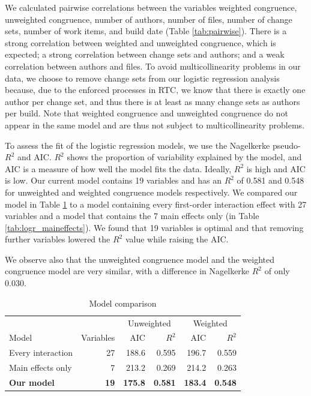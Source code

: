 \documentclass[12pt,oneside]{book}
\begin{document}
We calculated pairwise correlations between the variables weighted congruence, unweighted congruence, number of authors, number of files, number of change sets, number of work items, and build date (Table \ref{tab:pairwise}). There is a strong correlation between weighted and unweighted congruence, which is expected; a strong correlation between change sets and authors; and a weak correlation between authors and files. To avoid multicollinearity problems in our data, we choose to remove change sets from our logistic regression analysis because, due to the enforced processes in RTC, we know that there is exactly one author per change set, and thus there is at least as many change sets as authors per build. Note that weighted congruence and unweighted congruence do not appear in the same model and are thus not subject to multicollinearity problems.

To assess the fit of the logistic regression models, we use the Nagelkerke pseudo-$R^2$ and AIC. $R^2$ shows the proportion of variability explained by the model, and AIC is a measure of how well the model fits the data. Ideally, $R^2$ is high and AIC is low. Our current model contains 19 variables and has an $R^2$ of 0.581 and 0.548 for unweighted and weighted congruence models respectively. We compared our model in Table \ref{tab:models} to a model containing every first-order interaction effect with 27 variables and a model that contains the 7 main effects only (in Table \ref{tab:logr_maineffects}). We found that 19 variables is optimal and that removing further variables lowered the $R^2$ value while raising the AIC.

We observe also that the unweighted congruence model and the weighted congruence model are very similar, with a difference in Nagelkerke $R^2$ of only 0.030.

\begin{table}
\begin{center}
\begin{tabular}{l|r|rr|rr}

             & & \multicolumn{2}{c|}{Unweighted} & \multicolumn{2}{c}{Weighted} \\
Model                  & Variables    & AIC & $R^2$                       & AIC & $R^2$                      \\ \hline
Every interaction  & 27  & 188.6 & 0.595 & 196.7 & 0.559 \\
Main effects only & 7   & 213.2 & 0.269 & 214.2 & 0.263 \\
\textbf{Our model}         & \textbf{19}  & \textbf{175.8} & \textbf{0.581} & \textbf{183.4} & \textbf{0.548} \\
\hline
\end{tabular}
\end{center}
\caption{Model comparison}
\label{tab:models}
\end{table}
\end{document}
